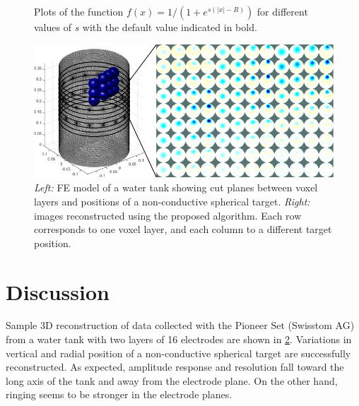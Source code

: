 \documentclass[10pt,a4paper]{article}
\begin{document}
\begin{multicols}{2}
\begin{figure}[H]
\hfill
{}
\caption{\label{fig:sigmoid_plot}
	Plots of the function $f(x) = 1 / (1 + e^{s(|x|-R)})$ for different values 
	of $s$ with the default value indicated in bold.
	}
\end{figure}
\begin{figure}[H]
\vspace{-5mm}
\includegraphics[width=\columnwidth]{tank_recon.pdf}
\caption{\label{fig:tank_recon} \emph{Left:} FE model of a water tank showing 
cut planes between voxel layers and positions of a non-conductive spherical 
target. \emph{Right:} images reconstructed using the proposed algorithm. Each 
row corresponds to one voxel layer, and each column to a different target 
position.}
\end{figure}

\section{Discussion}
Sample 3D reconstruction of data collected with the Pioneer Set (Swisstom AG) 
from a water tank with two layers of 16 electrodes are shown in 
\cref{fig:tank_recon}. Variations in vertical and radial position of a 
non-conductive spherical target are successfully reconstructed. 
As expected, amplitude response and 
resolution fall toward the long axis of the tank and away from the electrode 
plane. On the other hand, ringing seems to be stronger in the electrode planes.


\end{multicols}
\end{document}
